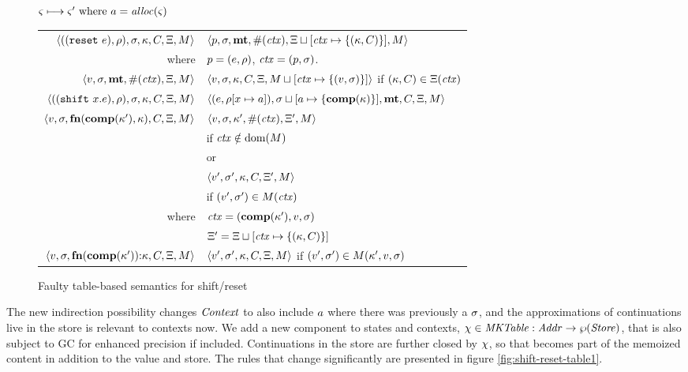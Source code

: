 \begin{figure}
  \centering
  $\varsigma \longmapsto \varsigma' \text{ where } a = \mathit{alloc}(\varsigma)$ \\
  \begin{tabular}{r|l}
    \hline
    $\langle ((\texttt{reset}\ e), \rho), \sigma, \kappa, C, \Xi, M \rangle$
    &
    $\langle p, \sigma, \mathbf{mt}, \#(\mathit{ctx}), \Xi\sqcup[\mathit{ctx} \mapsto \{ (\kappa,C) \}], M \rangle$
    \\
    where & $p = (e, \rho)$, $\mathit{ctx} = (p, \sigma)$.
    \\
    $\langle v, \sigma, \mathbf{mt}, \#(\mathit{ctx}), \Xi, M \rangle$
    &
    $\langle v, \sigma, {\kappa}, {C}, \Xi, M\sqcup[\mathit{ctx} \mapsto \{ (v,\sigma) \}] \rangle$
    if $(\kappa,C) \in \Xi(\mathit{ctx})$
    \\
    $\langle ((\texttt{shift}\ x. e), \rho), \sigma, \kappa, C, \Xi, M \rangle$
    &
    $\langle (e, \rho[x \mapsto a]), \sigma\sqcup[a \mapsto \{ \mathbf{comp}(\kappa) \}],\mathbf{mt},C,\Xi,M \rangle$
    \\
    $\langle v,\sigma,\mathbf{fn}{}(\mathbf{comp}(\kappa'), \kappa), C, \Xi, M \rangle$
    &
    $\langle v, \sigma, \kappa', \#(\mathit{ctx}), \Xi',M \rangle$
    \\ & \quad if $\mathit{ctx} \notin \text{dom}(M)$
    \\
    & or \\
    & $\langle v', \sigma', \kappa, C, \Xi',M \rangle$
    \\ & \quad if $(v',\sigma') \in M(\mathit{ctx})$
    \\
    where & $\mathit{ctx} = (\mathbf{comp}(\kappa'), v, \sigma)$ \\
          & $\Xi' = \Xi\sqcup[\mathit{ctx} \mapsto \{ (\kappa,C) \}]$
    \\
    $\langle v,\sigma,\mathbf{fn}{}(\mathbf{comp}(\kappa')){\tt :} \kappa, C, \Xi, M \rangle$
    &
    $\langle v', \sigma', \kappa, C, \Xi,M \rangle$ if $(v',\sigma') \in M(\kappa',v,\sigma)$
  \end{tabular}  
  \caption{Faulty table-based semantics for shift/reset}
  \label{fig:shift-reset-table0}
\end{figure}

The new indirection possibility changes $\mathit{Context}$ to also include $a$ where there was previously a $\sigma$, and the approximations of continuations live in the store is relevant to contexts now.
%
We add a new component to states and contexts, $\chi \in \mathit{MKTable} : \mathit{Addr} \to \wp(\mathit{Store})$, that is also subject to GC for enhanced precision if included.
%
Continuations in the store are further closed by $\chi$, so that becomes part of the memoized content in addition to the value and store.
%
The rules that change significantly are presented in figure \ref{fig:shift-reset-table1}.

